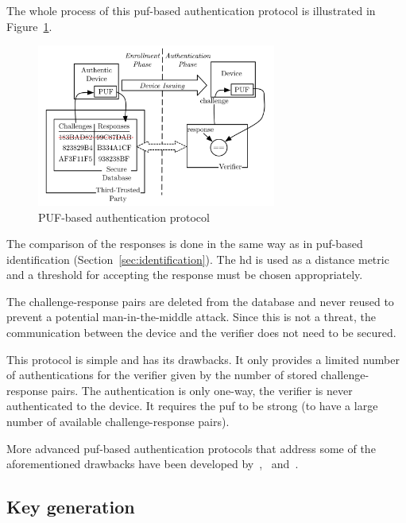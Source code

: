 The whole process of this \gls{puf}-based authentication protocol is illustrated in Figure~\ref{fig:authentication_process}.

\begin{figure}[ht!]
    \centering
    \captionsetup{justification=centering,margin=0.5cm}
    \includegraphics[width=0.7\textwidth]{images/authentication_process.png}
    \caption[PUF-based authentication protocol]{PUF-based authentication protocol\cite{Barbareschi2018}}
    \label{fig:authentication_process}
\end{figure}

The comparison of the responses is done in the same way as in \gls{puf}-based identification (Section~\ref{sec:identification}). The \gls{hd} is used as a distance metric and a threshold for accepting the response must be chosen appropriately.

The challenge-response pairs are deleted from the database and never reused to prevent a potential man-in-the-middle attack. Since this is not a threat, the communication between the device and the verifier does not need to be secured.

This protocol is simple and has its drawbacks. It only provides a limited number of authentications for the verifier given by the number of stored challenge-response pairs. The authentication is only one-way, the verifier is never authenticated to the device. It requires the \gls{puf} to be strong (to have a large number of available challenge-response pairs).

More advanced \gls{puf}-based authentication protocols that address some of the aforementioned drawbacks have been developed by~\cite{Maes2013},~\cite{Barbareschi2018} and~\cite{Rostami2014}.

\subsection{Key generation}

